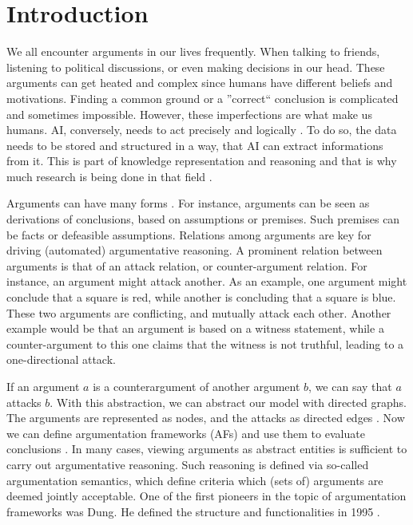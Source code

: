 \chapter{Introduction}
We all encounter arguments in our lives frequently. When talking to friends, listening to political discussions, or even making decisions in our head. These arguments can get heated and complex since humans have different beliefs and motivations. Finding a common ground or a ''correct`` conclusion is complicated and sometimes impossible. However, these imperfections are what make us humans. \ac{AI}, conversely, needs to act precisely and logically \cite{DBLP:journals/frai/DietzKM24}. To do so, the data needs to be stored and structured in a way, that AI can extract informations from it. This is part of knowledge representation and reasoning and that is why much research is being done in that field \cite{DBLP:journals/dagstuhl-manifestos/DelgrandeG0TW24, DBLP:journals/inffus/PopescuD23}.

Arguments can have many forms \cite{Toulmin_2003}. For instance, arguments can be seen as derivations of conclusions, based on assumptions or premises. Such premises can be facts or defeasible assumptions. Relations among arguments are key for driving (automated) argumentative reasoning. A prominent relation between arguments is that of an attack relation, or counter-argument relation. For instance, an argument might attack another. As an example, one argument might conclude that a square is red, while another is concluding that a square is blue. These two arguments are conflicting, and mutually attack each other. Another example would be that an argument is based on a witness statement, while a counter-argument to this one claims that the witness is not truthful, leading to a one-directional attack.



If an argument $a$ is a counterargument of another argument $b$, we can say that $a$ attacks $b$. With this abstraction, we can abstract our model with directed graphs. The arguments are represented as nodes, and the attacks as directed edges \cite{DUNG1995321}. Now we can define argumentation frameworks (AFs) and use them to evaluate conclusions \cite{DBLP:conf/fapr/Geffner96}. In many cases, viewing arguments as abstract entities is sufficient to carry out argumentative reasoning. Such reasoning is defined via so-called argumentation semantics, which define criteria which (sets of) arguments are deemed jointly acceptable. One of the first pioneers in the topic of argumentation frameworks was Dung. He defined the structure and functionalities in 1995 \cite{Dung1995-DUNOTA-2}.

